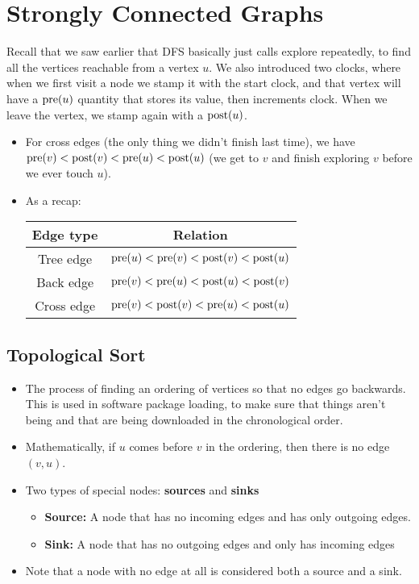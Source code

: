 \section{Strongly Connected Graphs}
	Recall that we saw earlier that DFS basically just calls explore repeatedly, to find all the vertices 
	reachable from a vertex $u$. We also introduced two clocks, where when we first visit a node 
	we stamp it with the start clock, and that vertex will have a $\mathrm{pre}(u)$ quantity that stores its value, 
	then increments clock. When we leave the vertex, we stamp again with a $\mathrm{post}(u)$. 

	\begin{itemize}
		\item For cross edges (the only thing we didn't finish last time), we have $\mathrm{pre}(v) < \mathrm{post}(v) <
			\mathrm{pre}(u) < \mathrm{post}(u)$ (we get to $v$ and finish exploring $v$ before we ever touch $u$).
		\item As a recap:
			\begin{center}
				\begin{tabular}{c|c}
					Edge type & Relation\\
					\hline
					Tree edge & $\mathrm{pre}(u)< \mathrm{pre}(v) < \mathrm{post}(v) < \mathrm{post}(u)$\\
					Back edge & $\mathrm{pre}(v) < \mathrm{pre}(u) < \mathrm{post}(u) < \mathrm{post}(v)$\\
					Cross edge & $\mathrm{pre}(v) < \mathrm{post}(v) < \mathrm{pre}(u) < \mathrm{post}(u)$
				\end{tabular}
			\end{center}
	\end{itemize}


	\subsection{Topological Sort} 
	\begin{itemize}
		\item The process of finding an ordering of vertices so that no edges go backwards. This is used 
			in software package loading, to make sure that things aren't being and that are being downloaded
			in the chronological order. 
		\item Mathematically, if $u$ comes before $v$ in the ordering, then there is no edge $(v, u)$. 
		\item Two types of special nodes: \textbf{sources} and \textbf{sinks}
			\begin{itemize}
				\item \textbf{Source:} A node that has no incoming edges and has only outgoing edges. 
				\item \textbf{Sink:} A node that has no outgoing edges and only has incoming edges
			\end{itemize}
		\item Note that a node with no edge at all is considered both a source and a sink.
	\end{itemize}
	
